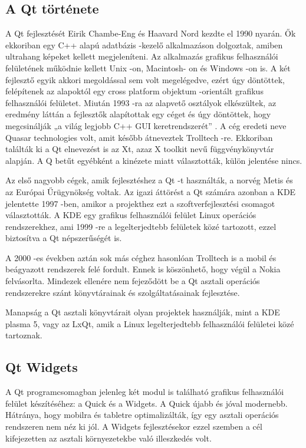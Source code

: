 \subsection{A Qt története}

A Qt fejlesztését Eirik Chambe-Eng és Haavard Nord kezdte el 1990 nyarán. 
Ők ekkoriban egy C++ alapú adatbázis -kezelő alkalmazáson dolgoztak, 
amiben ultrahang képeket kellett megjeleníteni. 
Az alkalmazás grafikus felhasználói felületének működnie kellett Unix -on, 
Macintosh- on és Windows -on is. 
A két fejlesztő egyik akkori megoldással sem volt megelégedve, ezért úgy döntöttek, 
felépítenek az
alapoktól egy cross platform objektum -orientált grafikus felhasználói felületet. 
Miután 1993 -ra az alapvető osztályok elkészültek, 
az eredmény láttán a fejlesztők alapítottak egy céget és úgy döntöttek, 
hogy megcsinálják „a világ 
legjobb C++ GUI keretrendszerét” \cite{qthistory}. 
A cég eredeti neve Quasar technologies volt, amit később átneveztek Trolltech -re. 
Ekkoriban találták ki a Qt elnevezést is az Xt, 
azaz X toolkit nevű függvénykönyvtár alapján. 
A Q betűt egyébként a kinézete miatt választották, 
külön jelentése nincs.

Az első nagyobb cégek, amik fejlesztéshez a Qt -t használták, 
a norvég Metis és az Európai Űrügynökség voltak. 
Az igazi áttörést a Qt számára azonban a KDE jelentette 1997 -ben, 
amikor a projekthez ezt a szoftverfejlesztési csomagot választották. 
A KDE egy grafikus felhasználói felület Linux operációs rendszerekhez, 
ami 1999 -re a legelterjedtebb felületek közé tartozott, 
ezzel biztosítva a Qt népszerűségét is.

A 2000 -es években aztán sok más céghez hasonlóan Trolltech is a mobil 
és beágyazott rendszerek felé fordult.
Ennek is köszönhető, hogy végül a Nokia felvásorlta.
Mindezek ellenére nem fejeződött be 
a Qt asztali operációs rendszerekre szánt könyvtárainak és 
szolgáltatásainak fejlesztése.

Manapság a Qt asztali könyvtárait olyan projektek használják, 
mint a KDE plasma 5, vagy az LxQt, 
amik a Linux legelterjedtebb felhasználói felületei közé tartoznak.

\subsection{Qt Widgets}

A Qt programcsomagban jelenleg két modul is található 
grafikus felhasználói felület készítéséhez:  
a Quick és a Widgets. 
A Quick újabb és jóval modernebb. 
Hátránya, hogy mobilra és tabletre optimalizálták,
így egy asztali operációs rendszeren nem néz ki jól. 
A Widgets fejlesztésekor ezzel szemben a cél kifejezetten 
az asztali környezetekbe való illeszkedés volt. 

